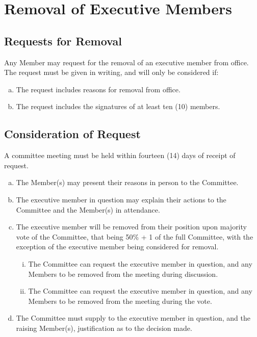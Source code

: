 \documentclass[a4paper,12pt]{article}
\begin{document}
\section{Removal of Executive Members}

\subsection{Requests for Removal}

Any Member may request for the removal of an executive member from office. The request must be given in writing, and will only be considered if:

\begin{enumerate}[a)]
	\item The request includes reasons for removal from office.
	\item The request includes the signatures of at least ten (10) members.
\end{enumerate}

\subsection{Consideration of Request}

A committee meeting must be held within fourteen (14) days of receipt of request.

\begin{enumerate}[a)]
	\item The Member(s) may present their reasons in person to the Committee.
	\item The executive member in question may explain their actions to the Committee and the Member(s) in attendance.
	\item The executive member will be removed from their position upon majority vote of the Committee, that being 50\% + 1 of the full Committee, with the exception of the executive member being considered for removal.
	\begin{enumerate}[i)]
		\item The Committee can request the executive member in question, and any Members to be removed from the meeting during discussion.
		\item The Committee can request the executive member in question, and any Members to be removed from the meeting during the vote.
	\end{enumerate}
	\item The Committee must supply to the executive member in question, and the raising Member(s), justification as to the decision made.
\end{enumerate}
\end{document}
